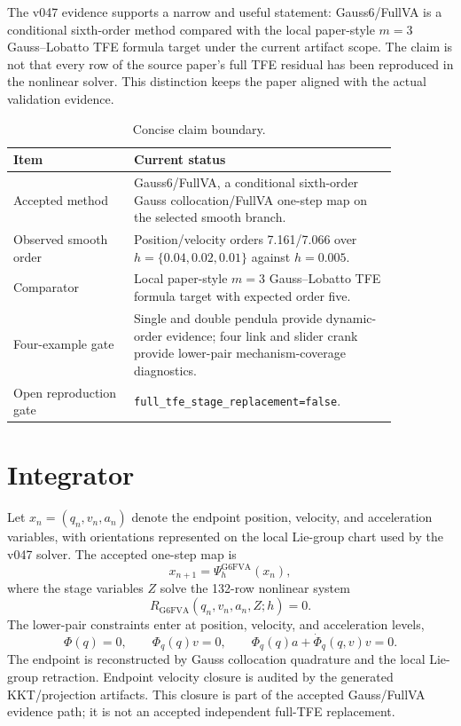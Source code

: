 \documentclass[11pt]{article}
\newcommand{\method}{Gauss6\slash FullVA}
\newcommand{\tfe}{TFE}
\begin{document}
The v047 evidence supports a narrow and useful statement: \method{} is a
conditional sixth-order method compared with the local paper-style $m=3$
Gauss--Lobatto \tfe{} formula target under the current artifact scope.  The
claim is not that every row of the source paper's full \tfe{} residual has been reproduced in the
nonlinear solver.  This distinction keeps the paper aligned with the actual
validation evidence.

\begin{table}[htbp]
\centering
\caption{Concise claim boundary.}
\label{tab:claim-boundary}
\begin{tabular}{P{0.27\linewidth}P{0.59\linewidth}}
\toprule
Item & Current status \\
\midrule
Accepted method &
\method{}, a conditional sixth-order Gauss collocation/FullVA one-step map on
the selected smooth branch. \\
Observed smooth order &
Position/velocity orders 7.161/7.066 over
$h=\{0.04,0.02,0.01\}$ against $h=0.005$. \\
Comparator &
Local paper-style $m=3$ Gauss--Lobatto \tfe{} formula target with expected
order five. \\
Four-example gate &
Single and double pendula provide dynamic-order evidence; four link and slider
crank provide lower-pair mechanism-coverage diagnostics. \\
Open reproduction gate &
\nolinkurl{full_tfe_stage_replacement=false}. \\
\bottomrule
\end{tabular}
\end{table}

\section{Integrator}

Let $x_n=(q_n,v_n,a_n)$ denote the endpoint position, velocity, and
acceleration variables, with orientations represented on the local Lie-group
chart used by the v047 solver.  The accepted one-step map is
\begin{equation}
  x_{n+1}=\Psi_h^{\mathrm{G6FVA}}(x_n),
\end{equation}
where the stage variables $Z$ solve the 132-row nonlinear system
\begin{equation}
  R_{\mathrm{G6FVA}}(q_n,v_n,a_n,Z;h)=0.
\end{equation}
The lower-pair constraints enter at position, velocity, and acceleration
levels,
\begin{equation}
  \Phi(q)=0,\qquad
  \Phi_q(q)v=0,\qquad
  \Phi_q(q)a+\dot{\Phi}_q(q,v)v=0.
\end{equation}
The endpoint is reconstructed by Gauss collocation quadrature and the local
Lie-group retraction.  Endpoint velocity closure is audited by the generated
KKT/projection artifacts.  This closure is part of the accepted Gauss/FullVA
evidence path; it is not an accepted independent full-\tfe{} replacement.
\end{document}
